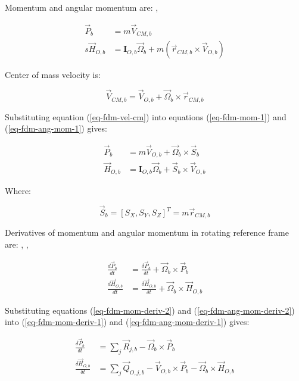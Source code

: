 Momentum and angular momentum are: \cite{Osinski1997}, \cite{Leyko2002}

\begin{align}
  \label{eq-fdm-mom-1} 
  {\vec P}_b
  &=
  m {\vec V}_{CM,b} \\
  \label{eq-fdm-ang-mom-1}s
  {\vec H}_{O,b}
  &=
  {\boldsymbol I}_{O,b} {\vec \Omega}_b
  +
  m \left( {\vec r}_{CM,b}
  \times
  {\vec V}_{O,b} \right)
\end{align}

Center of mass velocity is:

\begin{equation}
  \label{eq-fdm-vel-cm}
  {\vec V}_{CM,b}
  =
  {\vec V}_{O,b} + {\vec \Omega}_b \times {\vec r}_{CM,b}
\end{equation}

Substituting equation (\ref{eq-fdm-vel-cm}) into equations (\ref{eq-fdm-mom-1}) and (\ref{eq-fdm-ang-mom-1}) gives:

\begin{align}
  \label{eq-fdm-mom-2} 
  {\vec P}_b
  &=
  m {\vec V}_{O,b} + {\vec \Omega}_b
  \times
  {\vec S}_b \\
  \label{eq-fdm-ang-mom-2}
  {\vec H}_{O,b}
  &=
  {\boldsymbol I}_{O,b} {\vec \Omega}_b
  +
  {\vec S}_b \times {\vec V}_{O,b}
\end{align}

Where:

\begin{equation}
  {\vec S}_b = \left[ S_X, S_Y, S_Z \right]^T = m {\vec r}_{CM,b}
\end{equation}

Derivatives of momentum and angular momentum in rotating reference frame are: \cite{Taylor2005}, \cite{Osinski1997}, \cite{Leyko2002}

\begin{align}
  \label{eq-fdm-mom-deriv-2} 
  \frac{d {\vec P}_b}{dt}
  &=
  \frac{\delta {\vec P}_b}{\delta t}
  +
  {\vec \Omega}_b \times {\vec P}_b \\
  \label{eq-fdm-ang-mom-deriv-2}
  \frac{d {\vec H}_{O,b}}{dt}
  &=
  \frac{\delta {\vec H}_{O,b}}{\delta t}
  +
  {\vec \Omega}_b \times {\vec H}_{O,b}
\end{align}

Substituting equations (\ref{eq-fdm-mom-deriv-2}) and (\ref{eq-fdm-ang-mom-deriv-2}) into (\ref{eq-fdm-mom-deriv-1}) and (\ref{eq-fdm-ang-mom-deriv-1}) gives:

\begin{align}
  \label{eq-fdm-mom-deriv-3}
  \frac{\delta {\vec P}_b}{\delta t}
  &=
  \sum_{j} {\vec R}_{j,b}
  -
  {\vec \Omega}_b \times {\vec P}_b \\
  \label{eq-fdm-ang-mom-deriv-3}
  \frac{\delta {\vec H}_{O,b}}{\delta t}
  &=
  \sum_{j} {\vec Q}_{O,j,b}
  -
  {\vec V}_{O,b} \times {\vec P}_b
  -
  {\vec \Omega}_b \times {\vec H}_{O,b}
\end{align}

